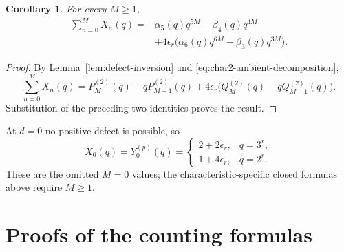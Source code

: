 \documentclass[a4paper,12pt]{amsart}
\newtheorem{cor}[thm]{Corollary}
\theoremstyle{definition}
\begin{document}
\begin{cor}
\label{cor:char2-extra-inertia-sum}
For every $M\geq1$,
\begin{align}
\sum_{n=0}^{M}X_n(q)
={}&
\alpha_5(q)q^{5M}-\beta_4(q)q^{4M}
\nonumber\\
&+4\epsilon_r\bigl(\alpha_6(q)q^{6M}-\beta_3(q)q^{3M}\bigr).
\label{eq:char2-extra-inertia-sum}
\end{align}
\end{cor}

\begin{proof}
By Lemma~\ref{lem:defect-inversion} and \eqref{eq:char2-ambient-decomposition},
\[
\sum_{n=0}^{M}X_n(q)
=
P_M^{(2)}(q)-qP_{M-1}^{(2)}(q)
+
4\epsilon_r\bigl(Q_M^{(2)}(q)-qQ_{M-1}^{(2)}(q)\bigr).
\]
Substitution of the preceding two identities proves the result.
\end{proof}

At $d=0$ no positive defect is possible, so
\begin{equation}
\label{eq:defect-height-zero}
X_0(q)=Y_0^{(p)}(q)
=
\begin{cases}
2+2\epsilon_r,&q=3^r,\\
1+4\epsilon_r,&q=2^r.
\end{cases}
\end{equation}
These are the omitted $M=0$ values; the characteristic-specific closed formulas above require $M\geq1$.


\section{Proofs of the counting formulas}
\label{sec:count}
\end{document}
